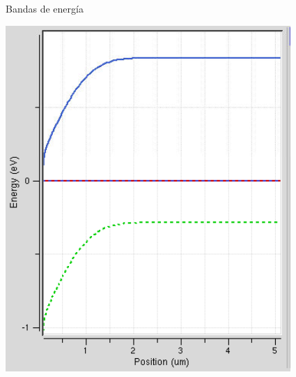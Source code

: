\documentclass{/home/daniel/GitHub/USC-Physics-Degree-Notes/Notes/Presentacion}
\begin{document}
\begin{frame}{Bandas de energía}
\begin{minipage}{0.55\linewidth}
        \includegraphics[width=0.7\linewidth]{../Imagenes/1-Band.png}
    \end{minipage}
\end{frame}
\end{document}
